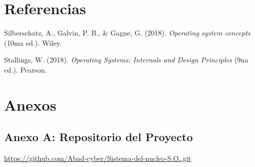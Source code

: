 \documentclass[12pt,a4paper]{article}
\begin{document}
\newpage
\section{Referencias}
\vspace{-0.5cm}
\setlength{\parindent}{0cm}

\noindent
\hangindent=1.27cm
Silberschatz, A., Galvin, P. B., \& Gagne, G. (2018). \textit{Operating system concepts} (10ma ed.). Wiley.

\vspace{0.3cm}
\noindent
\hangindent=1.27cm
Stallings, W. (2018). \textit{Operating Systems: Internals and Design Principles} (9na ed.). Pearson.

\vspace{1cm}
\setlength{\parindent}{1.27cm}
\section{Anexos}

\subsection{Anexo A: Repositorio del Proyecto}
\begin{center}
    \url{https://github.com/Abad-cyber/Sistema-del-nucleo-S.O..git}
\end{center}
\end{document}

